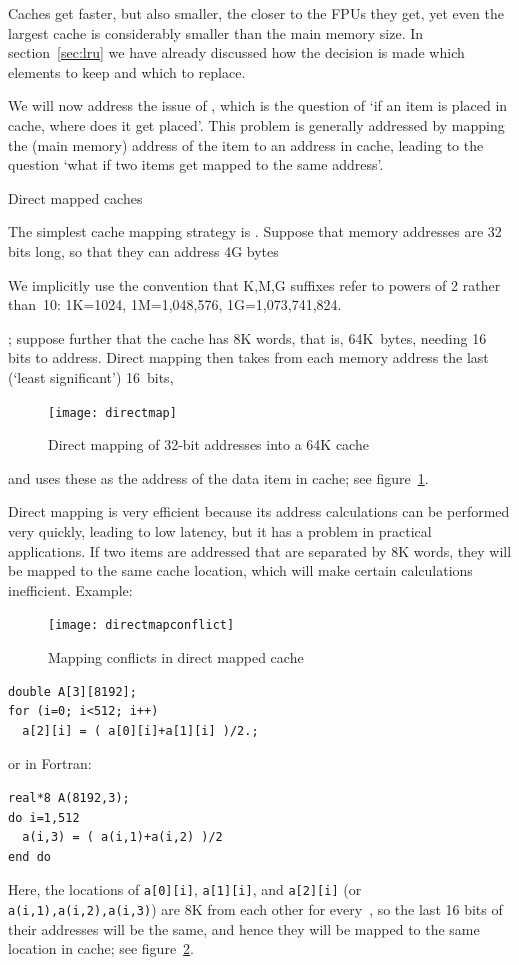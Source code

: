 Caches get faster, but also smaller, the closer to the \acp{FPU} they
get, yet even the largest cache is considerably smaller than the main
memory size. In section~\ref{sec:lru} we have already discussed how
the decision is made which elements to keep and which to replace.

We will now address the issue
of , which is the question of `if
an item is placed in cache, where does it get placed'. This problem is
generally addressed by mapping the (main memory) address of the item
to an address in cache, leading to the question `what if two items get
mapped to the same address'.

 {Direct mapped caches}
\label{sec:directmap}

The simplest cache mapping strategy is . Suppose that memory addresses are 32 bits long, so that
they can address 4G bytes
\begin{footnoteenv}
  {We implicitly use the convention
  that K,M,G suffixes refer to powers of 2 rather than~10: 1K=1024,
  1M=1,048,576, 1G=1,073,741,824.}
\end{footnoteenv}%
; suppose further that the
cache has 8K words, that is, 64K~bytes, needing 16 bits to address.
Direct mapping then takes from each memory address the last (`least
significant') 16~bits,
\begin{figure}[ht]
  \texttt{[image: directmap]}
  \caption{Direct mapping of 32-bit addresses into a 64K cache}
  \label{fig:directmap}
\end{figure}
and uses these as the address of the data item in cache; see figure~\ref{fig:directmap}.

Direct mapping is very efficient because its address calculations
can be performed very quickly, leading to low latency, but it
has a problem in practical applications. If two items are addressed
that are separated by 8K words, they will be mapped to the same cache
location, which will make certain calculations inefficient. Example:
%
\begin{figure}[ht]
  \texttt{[image: directmapconflict]}
  \caption{Mapping conflicts in direct mapped cache}
  \label{fig:directconflict}
\end{figure}
%
\begin{verbatim}
double A[3][8192];
for (i=0; i<512; i++)
  a[2][i] = ( a[0][i]+a[1][i] )/2.;
\end{verbatim}
or in Fortran:
\begin{verbatim}
real*8 A(8192,3);
do i=1,512
  a(i,3) = ( a(i,1)+a(i,2) )/2
end do
\end{verbatim}
Here, the locations of \texttt{a[0][i]}, \texttt{a[1][i]}, and
\texttt{a[2][i]} (or \texttt{a(i,1),a(i,2),a(i,3)})
are 8K from each other for every~, so the last
16 bits of their addresses will be the same, and hence they will
be mapped to the same location in cache; see figure~\ref{fig:directconflict}.


